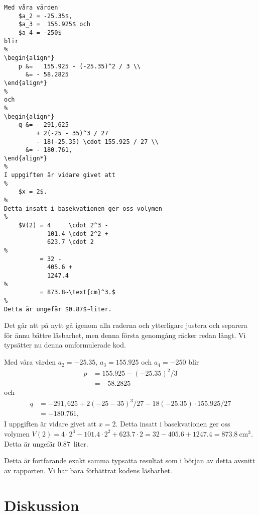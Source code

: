 \documentclass[a4paper,12pt]{article}
\begin{document}
\begin{lstlisting}
Med våra värden 
    $a_2 = -25.35$, 
    $a_3 =  155.925$ och 
    $a_4 = -250$ 
blir
%
\begin{align*}
    p &=   155.925 - (-25.35)^2 / 3 \\
      &= - 58.2825
\end{align*}
%
och
%
\begin{align*}
    q &= - 291,625  
         + 2(-25 - 35)^3 / 27 
         - 18(-25.35) \cdot 155.925 / 27 \\
      &= - 180.761,
\end{align*}
%
I uppgiften är vidare givet att 
%
    $x = 2$. 
%
Detta insatt i basekvationen ger oss volymen 
%
    $V(2) = 4     \cdot 2^3 - 
            101.4 \cdot 2^2 +
            623.7 \cdot 2 
%
          = 32 - 
            405.6 + 
            1247.4
%
          = 873.8~\text{cm}^3.$ 
%
Detta är ungefär $0.87$~liter.
\end{lstlisting}
%
Det går att på nytt gå igenom alla raderna och ytterligare justera och
separera för ännu bättre läsbarhet, men denna första genomgång räcker
redan långt. Vi typsätter nu denna omformulerade kod. 

\begin{mdframed}
Med våra värden 
    $a_2 = -25.35$, 
    $a_3 =  155.925$ och 
    $a_4 = -250$ 
blir
%
\begin{align*}
    p &=   155.925 - (-25.35)^2 / 3 \\
      &= - 58.2825
\end{align*}
%
och
%
\begin{align*}
    q &= - 291,625  
         + 2(-25 - 35)^3 / 27 
         - 18(-25.35) \cdot 155.925 / 27 \\
      &= - 180.761,
\end{align*}
%
I uppgiften är vidare givet att 
%
    $x = 2$. 
%
Detta insatt i basekvationen ger oss volymen 
%
    $V(2) = 4     \cdot 2^3 - 
            101.4 \cdot 2^2 +
            623.7 \cdot 2 
%
          = 32 - 
            405.6 + 
            1247.4
%
          = 873.8~\text{cm}^3.$ 
%
Detta är ungefär $0.87$~liter.
\end{mdframed}
%
Detta är fortfarande exakt samma typsatta resultat som i början av
detta avsnitt av rapporten. Vi har bara förbättrat kodens
läsbarhet.


\section{Diskussion}
\end{document}
